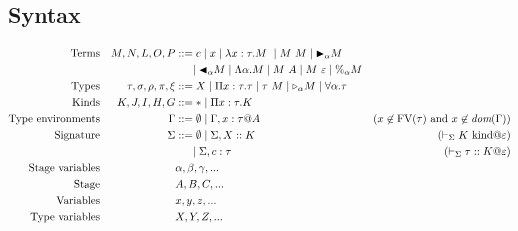 \subsection{Syntax}

\begin{align*}
	\textrm{Terms}             &  & M,N,L,O,P                & ::= c \mid x \mid \lambda x:\tau.M\ \mid M\ M \mid \TB_\alpha M                                                                                    \\
	                           &  &                          & \ \ \ \ \mid \TBL_\alpha M \mid \Lambda\alpha.M \mid M\ A \mid M\ \varepsilon \mid \%_\alpha M                                                                       \\
	\textrm{Types}             &  & \tau,\sigma,\rho,\pi,\xi & ::= X \mid \Pi x:\tau.\tau \mid \tau\ M \mid \TW_{\alpha} M \mid \F\alpha.\tau                                                                     \\
	\textrm{Kinds}             &  & K,J,I,H,G                & ::= * \mid \Pi x:\tau.K                                                                                                                            \\
	\textrm{Type environments} &  & \Gamma                   & ::= \emptyset \mid \Gamma,x:\tau@A                                             & (x\not\in\textrm{FV}(\tau)\ \text{and}\ x\not\in\textit{dom}(\G)) \\
	\textrm{Signature}         &  & \Sigma                   & ::= \emptyset \mid \Sigma,X::K                                                 & (\V K \iskind @ \varepsilon)                                      \\
	                           &  &                          & \ \ \ \ \mid \Sigma,c:\tau                                                             & (\V \tau :: K @ \varepsilon)                                      \\
	\textrm{Stage variables}   &  &                          & \alpha,\beta,\gamma,...                                                                                                                            \\
	\textrm{Stage}             &  &                          & A,B,C,...                                                                                                                                          \\
	\textrm{Variables}         &  &                          & x,y,z,...                                                                                                                                          \\
	\textrm{Type variables}    &  &                          & X,Y,Z,...                                                                                                                                          \\
\end{align*}

